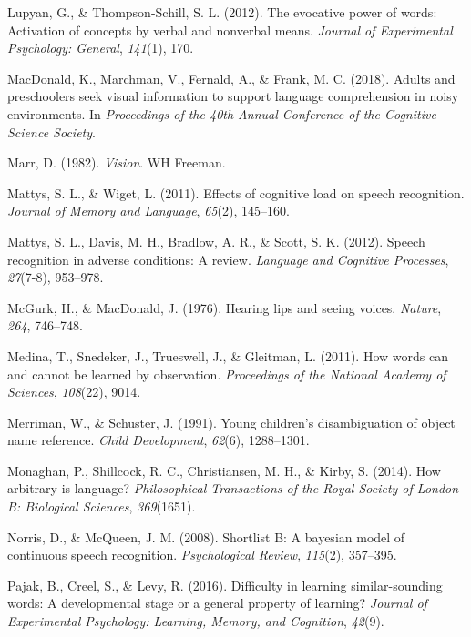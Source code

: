 \documentclass[english,,man,floatsintext]{apa6}
\theoremstyle{definition}
\theoremstyle{definition}
\theoremstyle{definition}
\theoremstyle{remark}
\begin{document}
\hypertarget{ref-lupyan2012}{}
Lupyan, G., \& Thompson-Schill, S. L. (2012). The evocative power of
words: Activation of concepts by verbal and nonverbal means.
\emph{Journal of Experimental Psychology: General}, \emph{141}(1), 170.

\hypertarget{ref-macdonald2018}{}
MacDonald, K., Marchman, V., Fernald, A., \& Frank, M. C. (2018). Adults
and preschoolers seek visual information to support language
comprehension in noisy environments. In \emph{Proceedings of the 40th
Annual Conference of the Cognitive Science Society}.

\hypertarget{ref-marr1982}{}
Marr, D. (1982). \emph{Vision}. WH Freeman.

\hypertarget{ref-mattys11}{}
Mattys, S. L., \& Wiget, L. (2011). Effects of cognitive load on speech
recognition. \emph{Journal of Memory and Language}, \emph{65}(2),
145--160.

\hypertarget{ref-mattys12}{}
Mattys, S. L., Davis, M. H., Bradlow, A. R., \& Scott, S. K. (2012).
Speech recognition in adverse conditions: A review. \emph{Language and
Cognitive Processes}, \emph{27}(7-8), 953--978.

\hypertarget{ref-mcgurk1976}{}
McGurk, H., \& MacDonald, J. (1976). Hearing lips and seeing voices.
\emph{Nature}, \emph{264}, 746--748.

\hypertarget{ref-medina2011}{}
Medina, T., Snedeker, J., Trueswell, J., \& Gleitman, L. (2011). How
words can and cannot be learned by observation. \emph{Proceedings of the
National Academy of Sciences}, \emph{108}(22), 9014.

\hypertarget{ref-Merriman91}{}
Merriman, W., \& Schuster, J. (1991). Young children's disambiguation of
object name reference. \emph{Child Development}, \emph{62}(6),
1288--1301.

\hypertarget{ref-Monaghan2014}{}
Monaghan, P., Shillcock, R. C., Christiansen, M. H., \& Kirby, S.
(2014). How arbitrary is language? \emph{Philosophical Transactions of
the Royal Society of London B: Biological Sciences}, \emph{369}(1651).

\hypertarget{ref-Norris08}{}
Norris, D., \& McQueen, J. M. (2008). Shortlist B: A bayesian model of
continuous speech recognition. \emph{Psychological Review},
\emph{115}(2), 357--395.

\hypertarget{ref-pajak2016}{}
Pajak, B., Creel, S., \& Levy, R. (2016). Difficulty in learning
similar-sounding words: A developmental stage or a general property of
learning? \emph{Journal of Experimental Psychology: Learning, Memory,
and Cognition}, \emph{42}(9).
\end{document}
